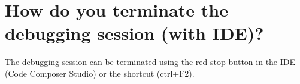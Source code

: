 \section[short]{How do you terminate the debugging session (with IDE)?}

The debugging session can be terminated using the red stop button in the IDE (Code Composer Studio) or the shortcut (ctrl+F2).